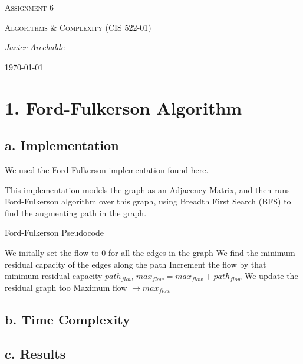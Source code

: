 \documentclass{article}
\begin{document}
\begin{titlepage}
	\centering
	{\scshape\LARGE Assignment 6\par}
	\vspace{1cm}
	{\scshape\Large Algorithms \& Complexity (CIS 522-01)\par}
	\vspace{1.5cm}
	{\Large\itshape Javier Arechalde\par}
	\vfill
	{\large \today\par}
\end{titlepage}

\section*{1. Ford-Fulkerson Algorithm}

\subsection*{a. Implementation}

We used the Ford-Fulkerson implementation found \href{https://www.geeksforgeeks.org/ford-fulkerson-algorithm-for-maximum-flow-problem/}{here}.

This implementation models the graph as an Adjacency Matrix, and then runs Ford-Fulkerson algorithm over this graph, using Breadth First Search (BFS) to find the augmenting path in the graph.

\begin{algorithm}[H]
\caption{Ford-Fulkerson Pseudocode}
\begin{algorithmic}[1]
 \State We initally set the flow to 0 for all the edges in the graph
  \State We find the minimum residual capacity of the edges along the path
  \State Increment the flow by that minimum residual capacity $path_{flow}$
  \State $max_{flow} = max_{flow} + path_{flow}$
  \State We update the residual graph too
 \EndWhile
 \State \Return Maximum flow $\rightarrow max_{flow}$
\EndFunction
\end{algorithmic}
\end{algorithm}

\subsection*{b. Time Complexity}

\subsection*{c. Results}
\end{document}
